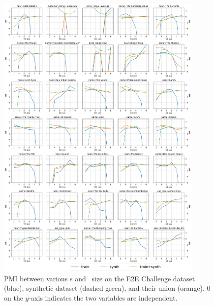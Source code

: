 
\begin{figure}[p]
\centering
    \includegraphics[width=0.9\textwidth]{nlg/synthpmis.pdf}
\caption{PMI between various \attributevalue s and \meaningrepresentation~size
on the E2E Challenge dataset (blue), synthetic dataset (dashed green), and their union (orange). 0 on the $y$-axis indicates the two variables are independent.}
\label{fig:synthpmi}
\end{figure}
